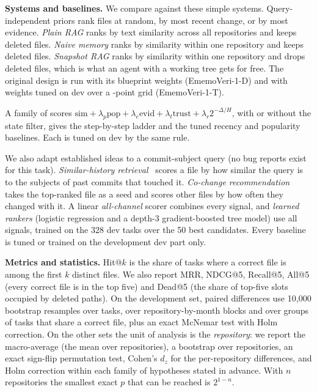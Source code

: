 \documentclass[conference]{IEEEtran}
\newcommand{\sys}{EmemoVeri}
\begin{document}
\textbf{Systems and baselines.} We compare against these simple systems. Query-independent priors rank files at random, by most recent change, or by most evidence. \emph{Plain RAG} ranks by text similarity across all repositories and keeps deleted files. \emph{Naive memory} ranks by similarity within one repository and keeps deleted files. \emph{Snapshot RAG} ranks by similarity within one repository and drops deleted files, which is what an agent with a working tree gets for free. The original design is run with its blueprint weights (\sys{}-1-D) and with weights tuned on dev over a \gridSize{}-point grid (\sys{}-1-T).

A family of scores $\mathrm{sim}+\lambda_p\mathrm{pop}+\lambda_e\mathrm{evid}+\lambda_t\mathrm{trust}+\lambda_r 2^{-\Delta/H}$, with or without the state filter, gives the step-by-step ladder and the tuned recency and popularity baselines. Each is tuned on dev by the same rule.

We also adapt established ideas to a commit-subject query (no bug reports exist for this task). \emph{Similar-history retrieval}~\cite{zhou2012buglocator} scores a file by how similar the query is to the subjects of past commits that touched it. \emph{Co-change recommendation}~\cite{zimmermann2005mining} takes the top-ranked file as a seed and scores other files by how often they changed with it. A linear \emph{all-channel} scorer combines every signal, and \emph{learned rankers} (logistic regression and a depth-3 gradient-boosted tree model) use all signals, trained on the 328 dev tasks over the 50 best candidates. Every baseline is tuned or trained on the development dev part only.

\textbf{Metrics and statistics.} Hit@$k$ is the share of tasks where a correct file is among the first $k$ distinct files. We also report MRR, NDCG@5, Recall@5, All@5 (every correct file is in the top five) and Dead@5 (the share of top-five slots occupied by deleted paths). On the development set, paired differences use 10{,}000 bootstrap resamples over tasks, over repository-by-month blocks and over groups of tasks that share a correct file, plus an exact McNemar test with Holm correction. On the other sets the unit of analysis is the \emph{repository}: we report the macro-average (the mean over repositories), a bootstrap over repositories, an exact sign-flip permutation test, Cohen's $d_z$ for the per-repository differences, and Holm correction within each family of hypotheses stated in advance. With $n$ repositories the smallest exact $p$ that can be reached is $2^{1-n}$.
\end{document}
